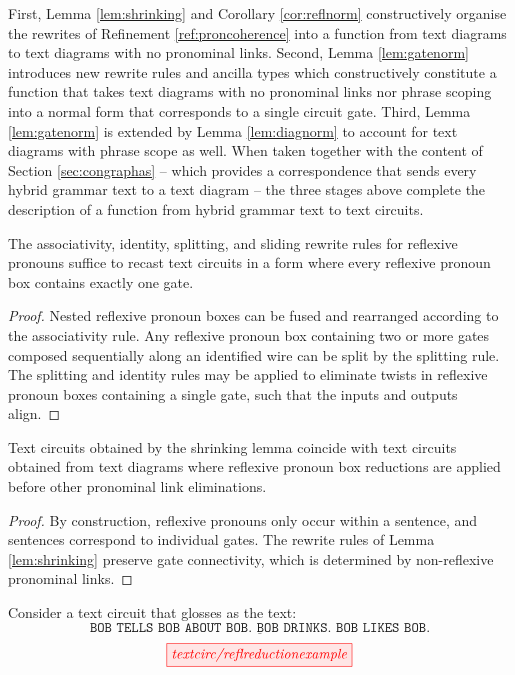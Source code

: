 First, Lemma \ref{lem:shrinking} and Corollary \ref{cor:reflnorm} constructively organise the rewrites of Refinement \ref{ref:proncoherence} into a function from text diagrams to text diagrams with no pronominal links.
Second, Lemma \ref{lem:gatenorm} introduces new rewrite rules and ancilla types which constructively constitute a function that takes text diagrams with no pronominal links nor phrase scoping into a normal form that corresponds to a single circuit gate.
Third, Lemma \ref{lem:gatenorm} is extended by Lemma \ref{lem:diagnorm} to account for text diagrams with phrase scope as well.
When taken together with the content of Section \ref{sec:congraphas} -- which provides a correspondence that sends every hybrid grammar text to a text diagram -- the three stages above complete the description of a function from hybrid grammar text to text circuits.

\begin{lemma}
\label{lem:shrinking}
The associativity, identity, splitting, and sliding rewrite rules for reflexive pronouns suffice to recast text circuits in a form where every reflexive pronoun box contains exactly one gate.
\begin{proof}
Nested reflexive pronoun boxes can be fused and rearranged according to the associativity rule. Any reflexive pronoun box containing two or more gates composed sequentially along an identified wire can be split by the splitting rule. The splitting and identity rules may be applied to eliminate twists in reflexive pronoun boxes containing a single gate, such that the inputs and outputs align.
\end{proof}
\end{lemma}

\begin{corollary}\label{cor:reflnorm}
Text circuits obtained by the shrinking lemma coincide with text circuits obtained from text diagrams where reflexive pronoun box reductions are applied before other pronominal link eliminations.
\begin{proof}
By construction, reflexive pronouns only occur within a sentence, and sentences correspond to individual gates. The rewrite rules of Lemma \ref{lem:shrinking} preserve gate connectivity, which is determined by non-reflexive pronominal links.
\end{proof}
\end{corollary}

\begin{example}
Consider a text circuit that glosses as the text:
\[\underline{\texttt{BOB TELLS BOB ABOUT BOB. BOB DRINKS. BOB LIKES BOB.}}\]
\[\tikzfig{textcirc/reflreductionexample}\]
\end{example}

